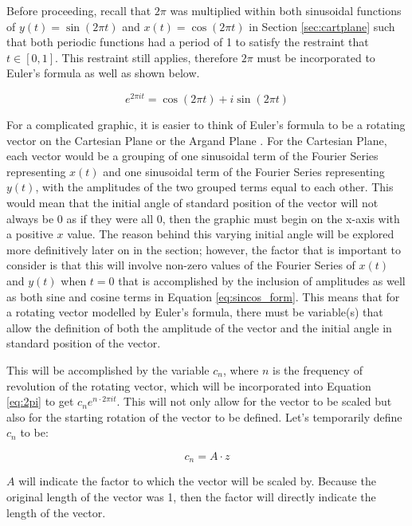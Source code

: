 \documentclass[letterpaper, 12pt]{article}
\begin{document}
Before proceeding, recall that \(2\pi\) was multiplied within
both sinusoidal functions of \(y(t) = \sin (2\pi t)\)
and \(x(t) = \cos (2\pi t)\) in Section \ref*{sec:cartplane}
such that both periodic functions had a period of 1
to satisfy the restraint that \(t \in [0, 1]\).
This restraint still applies, therefore \(2 \pi\)
must be incorporated to Euler's formula as well
as shown below.

\begin{equation}
    e^{2\pi it} = \cos(2\pi t) + i\sin(2\pi t)
    \label{eq:2pi}
\end{equation}

For a complicated graphic,
it is easier to think of Euler's formula to be a rotating vector on the
Cartesian Plane or the
Argand Plane \cite{sandersonWhatFourierSeries2019}.
For the Cartesian Plane, each vector would be a grouping of one
sinusoidal term of the Fourier Series representing \(x(t)\)
and one sinusoidal term of the Fourier Series representing \(y(t)\),
with the amplitudes of the two grouped terms equal to each other. This would mean
that the initial angle of standard position of the vector will not
always be 0 as if they were all 0, then the graphic must begin
on the x-axis with a positive \(x\) value. The reason behind
this varying initial angle will be explored more definitively later on
in the section; however, the factor that is important to consider
is that this will involve non-zero values of the Fourier Series of \(x(t)\) and \(y(t)\) when \(t=0\) that is accomplished by
the inclusion of amplitudes as well as both sine and cosine terms in Equation \ref*{eq:sincos_form}.
This means that for a rotating vector modelled by Euler's formula,
there must be variable(s) that allow the definition of both
the amplitude of the vector and the initial angle in standard
position of the vector.

This will be accomplished by the variable \(c_n\), where \(n\) is the frequency
of revolution of the rotating vector,
which will be incorporated into Equation \ref*{eq:2pi} to get \(c_n e^{n \cdot 2\pi it}\). This will not
only allow for the vector to be scaled but also for the starting rotation of
the vector to be defined. Let's temporarily define \(c_n\) to be:

\begin{equation*}
    c_n = A \cdot z
\end{equation*}

\(A\) will indicate the factor to which the vector will be scaled by. Because
the original length of the vector was 1, then the factor will directly indicate
the length of the vector.
\end{document}
